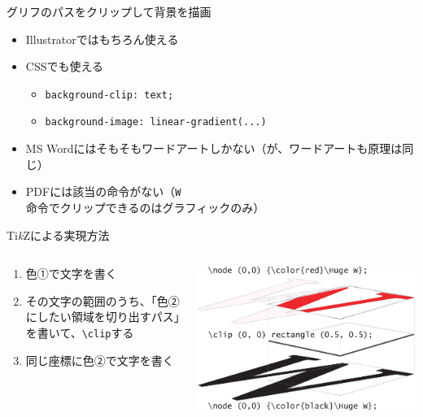 \documentclass[unicode,14pt]{beamer}
\newcommand{\TikZ}{Ti\textit{k}Z}
\begin{document}
\begin{frame}[t]{グリフのパスをクリップして背景を描画}
  \sffamily
  \begin{itemize}
\item Illustratorではもちろん使える
\item CSSでも使える
  \begin{itemize}
  \item \texttt{background-clip: text;}
  \item \texttt{background-image: linear-gradient(...)}
  \end{itemize}  
\item MS Wordにはそもそもワードアートしかない（が、ワードアートも原理は同じ）
\item PDFには該当の命令がない（\texttt{W}命令でクリップできるのはグラフィックのみ）
  \end{itemize}
\end{frame}

\begin{frame}[t]{\TikZ{}による実現方法}
  \sffamily
  \begin{columns}[t]
    \begin{column}{.4\textwidth}
  \begin{enumerate}
\item 色①で文字を書く
\item その文字の範囲のうち、「色②にしたい領域を切り出すパス」を書いて、\texttt{\textbackslash{}clip}する
\item 同じ座標に色②で文字を書く
  \end{enumerate}
    \end{column}
    \begin{column}{.6\textwidth}
  \begin{center}
    \includegraphics[width=\textwidth]{figures/w-clip.pdf}
  \end{center}
    \end{column}
  \end{columns}
\end{frame}
\end{document}
